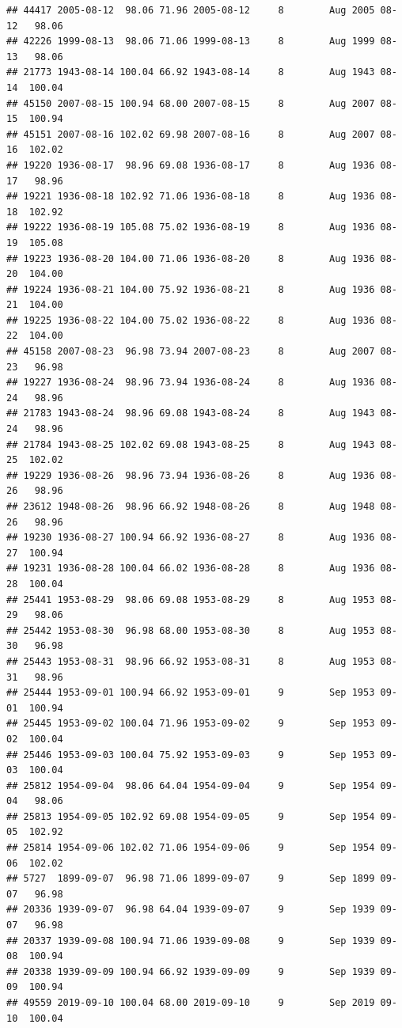 \documentclass{article}\usepackage[]{graphicx}\usepackage[]{color}
\makeatletter
\newenvironment{kframe}{%
 \def\at@end@of@kframe{}%
 \ifinner\ifhmode%
  \def\at@end@of@kframe{\end{minipage}}%
  \begin{minipage}{\columnwidth}%
 \fi\fi%
 \def\FrameCommand##1{\hskip\@totalleftmargin \hskip-\fboxsep
 \colorbox{shadecolor}{##1}\hskip-\fboxsep
     \hskip-\linewidth \hskip-\@totalleftmargin \hskip\columnwidth}%
 \MakeFramed {\advance\hsize-\width
   \@totalleftmargin\z@ \linewidth\hsize
   \@setminipage}}%
 {\par\unskip\endMakeFramed%
 \at@end@of@kframe}
\newenvironment{knitrout}{}{} %
\makeatother
\begin{document}
\begin{knitrout}
\begin{kframe}
\begin{verbatim}
## 44417 2005-08-12  98.06 71.96 2005-08-12     8        Aug 2005 08-12   98.06
## 42226 1999-08-13  98.06 71.06 1999-08-13     8        Aug 1999 08-13   98.06
## 21773 1943-08-14 100.04 66.92 1943-08-14     8        Aug 1943 08-14  100.04
## 45150 2007-08-15 100.94 68.00 2007-08-15     8        Aug 2007 08-15  100.94
## 45151 2007-08-16 102.02 69.98 2007-08-16     8        Aug 2007 08-16  102.02
## 19220 1936-08-17  98.96 69.08 1936-08-17     8        Aug 1936 08-17   98.96
## 19221 1936-08-18 102.92 71.06 1936-08-18     8        Aug 1936 08-18  102.92
## 19222 1936-08-19 105.08 75.02 1936-08-19     8        Aug 1936 08-19  105.08
## 19223 1936-08-20 104.00 71.06 1936-08-20     8        Aug 1936 08-20  104.00
## 19224 1936-08-21 104.00 75.92 1936-08-21     8        Aug 1936 08-21  104.00
## 19225 1936-08-22 104.00 75.02 1936-08-22     8        Aug 1936 08-22  104.00
## 45158 2007-08-23  96.98 73.94 2007-08-23     8        Aug 2007 08-23   96.98
## 19227 1936-08-24  98.96 73.94 1936-08-24     8        Aug 1936 08-24   98.96
## 21783 1943-08-24  98.96 69.08 1943-08-24     8        Aug 1943 08-24   98.96
## 21784 1943-08-25 102.02 69.08 1943-08-25     8        Aug 1943 08-25  102.02
## 19229 1936-08-26  98.96 73.94 1936-08-26     8        Aug 1936 08-26   98.96
## 23612 1948-08-26  98.96 66.92 1948-08-26     8        Aug 1948 08-26   98.96
## 19230 1936-08-27 100.94 66.92 1936-08-27     8        Aug 1936 08-27  100.94
## 19231 1936-08-28 100.04 66.02 1936-08-28     8        Aug 1936 08-28  100.04
## 25441 1953-08-29  98.06 69.08 1953-08-29     8        Aug 1953 08-29   98.06
## 25442 1953-08-30  96.98 68.00 1953-08-30     8        Aug 1953 08-30   96.98
## 25443 1953-08-31  98.96 66.92 1953-08-31     8        Aug 1953 08-31   98.96
## 25444 1953-09-01 100.94 66.92 1953-09-01     9        Sep 1953 09-01  100.94
## 25445 1953-09-02 100.04 71.96 1953-09-02     9        Sep 1953 09-02  100.04
## 25446 1953-09-03 100.04 75.92 1953-09-03     9        Sep 1953 09-03  100.04
## 25812 1954-09-04  98.06 64.04 1954-09-04     9        Sep 1954 09-04   98.06
## 25813 1954-09-05 102.92 69.08 1954-09-05     9        Sep 1954 09-05  102.92
## 25814 1954-09-06 102.02 71.06 1954-09-06     9        Sep 1954 09-06  102.02
## 5727  1899-09-07  96.98 71.06 1899-09-07     9        Sep 1899 09-07   96.98
## 20336 1939-09-07  96.98 64.04 1939-09-07     9        Sep 1939 09-07   96.98
## 20337 1939-09-08 100.94 71.06 1939-09-08     9        Sep 1939 09-08  100.94
## 20338 1939-09-09 100.94 66.92 1939-09-09     9        Sep 1939 09-09  100.94
## 49559 2019-09-10 100.04 68.00 2019-09-10     9        Sep 2019 09-10  100.04

\end{verbatim}
\end{kframe}
\end{knitrout}
\end{document}

